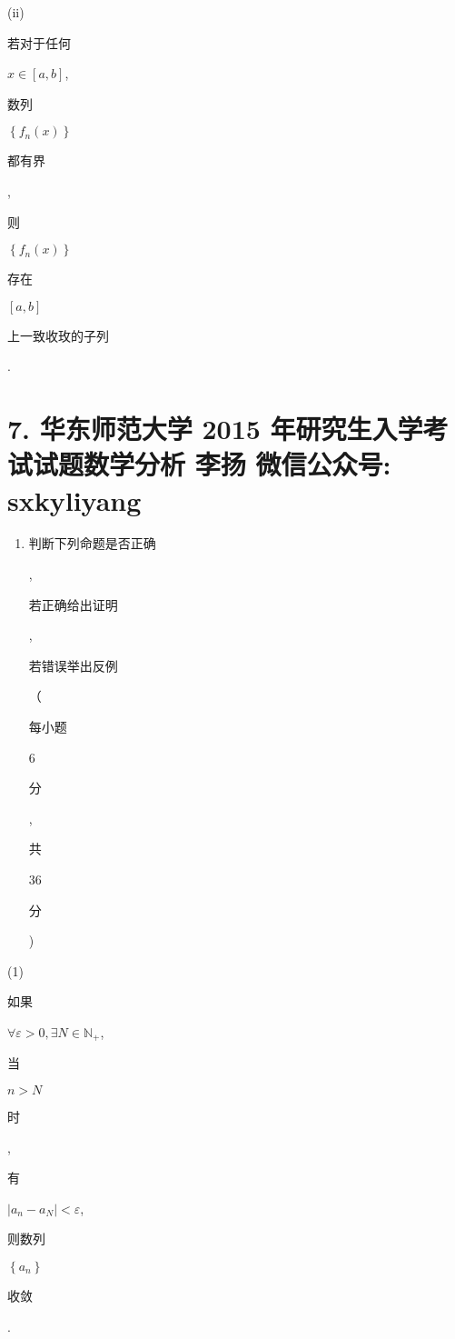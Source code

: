 \documentclass[10pt]{article}
\begin{document}
(ii) \begin{CJK}{UTF8}{mj}若对于任何\end{CJK} $x \in[a, b]$, \begin{CJK}{UTF8}{mj}数列\end{CJK} $\left\{f_{n}(x)\right\}$ \begin{CJK}{UTF8}{mj}都有界\end{CJK}, \begin{CJK}{UTF8}{mj}则\end{CJK} $\left\{f_{n}(x)\right\}$ \begin{CJK}{UTF8}{mj}存在\end{CJK} $[a, b]$ \begin{CJK}{UTF8}{mj}上一致收玫的子列\end{CJK}.

\section{7. 华东师范大学 2015 年研究生入学考试试题数学分析 
 李扬 
 微信公众号: sxkyliyang}
\begin{enumerate}
  \item \begin{CJK}{UTF8}{mj}判断下列命题是否正确\end{CJK}, \begin{CJK}{UTF8}{mj}若正确给出证明\end{CJK}, \begin{CJK}{UTF8}{mj}若错误举出反例\end{CJK}（\begin{CJK}{UTF8}{mj}每小题\end{CJK} 6 \begin{CJK}{UTF8}{mj}分\end{CJK}, \begin{CJK}{UTF8}{mj}共\end{CJK} 36 \begin{CJK}{UTF8}{mj}分\end{CJK})
\end{enumerate}
(1) \begin{CJK}{UTF8}{mj}如果\end{CJK} $\forall \varepsilon>0, \exists N \in \mathbb{N}_{+}$, \begin{CJK}{UTF8}{mj}当\end{CJK} $n>N$ \begin{CJK}{UTF8}{mj}时\end{CJK}, \begin{CJK}{UTF8}{mj}有\end{CJK} $\left|a_{n}-a_{N}\right|<\varepsilon$, \begin{CJK}{UTF8}{mj}则数列\end{CJK} $\left\{a_{n}\right\}$ \begin{CJK}{UTF8}{mj}收敛\end{CJK}.
\end{document}
